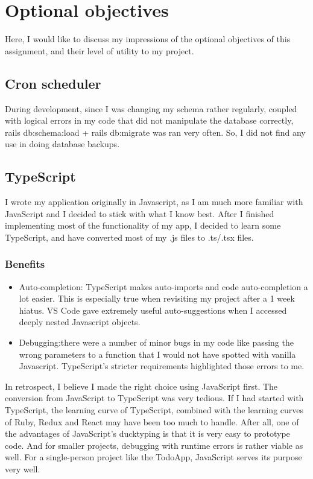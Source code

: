 \documentclass{article}
\begin{document}
\section{Optional objectives}
Here, I would like to discuss my impressions of the optional objectives of this assignment, and their level of utility to my project. 
\subsection{Cron scheduler}
During development, since I was changing my schema rather regularly, coupled with logical errors in my code that did not manipulate the database correctly, rails db:schema:load + rails db:migrate was ran very often. So, I did not find any use in doing database backups.

\subsection{TypeScript}
I wrote my application originally in Javascript, as I am much more familiar with JavaScript and I decided to stick with what I know best.
After I finished implementing most of the functionality of my app, I decided to learn some TypeScript, and have converted most of my .js files to .ts/.tsx files.

\subsubsection{Benefits}
\begin{itemize}
  \item Auto-completion: TypeScript makes auto-imports and code auto-completion a lot easier. This is especially true when revisiting my project after a 1 week hiatus. VS Code gave extremely useful auto-suggestions when I accessed deeply nested Javascript objects.
  \item Debugging:there were a number of minor bugs in my code like passing the wrong parameters to a function that I would not have spotted with vanilla Javascript. TypeScript’s stricter requirements highlighted those errors to me.
\end{itemize}

In retrospect, I believe I made the right choice using JavaScript first. The conversion from JavaScript to TypeScript was very tedious. If I had started with TypeScript, the learning curve of TypeScript, combined with the learning curves of Ruby, Redux and React may have been too much to handle. After all, one of the advantages of JavaScript’s ducktyping is that it is very easy to prototype code. And for smaller projects, debugging with runtime errors is rather viable as well. For a single-person project like the TodoApp, JavaScript serves its purpose very well.
\end{document}
